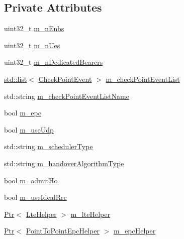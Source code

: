 \subsection*{Private Attributes}
\begin{DoxyCompactItemize}
\item 
uint32\+\_\+t \hyperlink{classLteX2HandoverMeasuresTestCase_a8523db26f3f2eb12341deccb7ed080a0}{m\+\_\+n\+Enbs}
\item 
uint32\+\_\+t \hyperlink{classLteX2HandoverMeasuresTestCase_ae1004b50e090574412d9f365e4311d83}{m\+\_\+n\+Ues}
\item 
uint32\+\_\+t \hyperlink{classLteX2HandoverMeasuresTestCase_ad17cde512352c02e24f17299705add5c}{m\+\_\+n\+Dedicated\+Bearers}
\item 
\hyperlink{openflow-interface_8h_afd9bcfa176617760671b67580f536fa7}{std\+::list}$<$ \hyperlink{structCheckPointEvent}{Check\+Point\+Event} $>$ \hyperlink{classLteX2HandoverMeasuresTestCase_a2bd309a4202b3f5d7f1978f8b9427478}{m\+\_\+check\+Point\+Event\+List}
\item 
std\+::string \hyperlink{classLteX2HandoverMeasuresTestCase_a968225907c8534afaedd37f51c440de5}{m\+\_\+check\+Point\+Event\+List\+Name}
\item 
bool \hyperlink{classLteX2HandoverMeasuresTestCase_aa8fbf977c7cbd51e34d1943b4cd60aef}{m\+\_\+epc}
\item 
bool \hyperlink{classLteX2HandoverMeasuresTestCase_a5a6facbcae0302e2c0ec63ed14e20301}{m\+\_\+use\+Udp}
\item 
std\+::string \hyperlink{classLteX2HandoverMeasuresTestCase_a39cc90332afbf5bb4e3d12f707faef82}{m\+\_\+scheduler\+Type}
\item 
std\+::string \hyperlink{classLteX2HandoverMeasuresTestCase_a3e41999ac3cec3a0b4e473c18d0a8522}{m\+\_\+handover\+Algorithm\+Type}
\item 
bool \hyperlink{classLteX2HandoverMeasuresTestCase_a471a92e753b7e5750ca321a068d99bb7}{m\+\_\+admit\+Ho}
\item 
bool \hyperlink{classLteX2HandoverMeasuresTestCase_a79b9c697557a4e8f4ee6b8f777229b5e}{m\+\_\+use\+Ideal\+Rrc}
\item 
\hyperlink{classns3_1_1Ptr}{Ptr}$<$ \hyperlink{classns3_1_1LteHelper}{Lte\+Helper} $>$ \hyperlink{classLteX2HandoverMeasuresTestCase_a5d9f434c242eb81dba2d8e99c43e7046}{m\+\_\+lte\+Helper}
\item 
\hyperlink{classns3_1_1Ptr}{Ptr}$<$ \hyperlink{classns3_1_1PointToPointEpcHelper}{Point\+To\+Point\+Epc\+Helper} $>$ \hyperlink{classLteX2HandoverMeasuresTestCase_a1ed4aafe2190532479d857923d423d54}{m\+\_\+epc\+Helper}

\end{DoxyCompactItemize}

